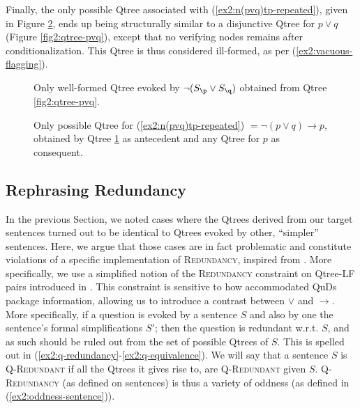 Finally, the only possible Qtree associated with (\ref{ex2:n(pvq)tp-repeated}), given in Figure \ref{fig2:qtree-n(pvq)tp-wh}, ends up being structurally similar to a disjunctive Qtree for $p\vee q$ (Figure \ref{fig2:qtree-pvq}), except that no verifying nodes remains after conditionalization. This Qtree is thus considered ill-formed, as per (\ref{ex2:vacuous-flagging}).	


\begin{multicols}{2}
	\begin{figure}[H]
		\centering
		\scalebox{1}{
			\begin{forest}
				[CS [{$\p$}] [{$\q$}] [\fbox{\r}] [\fbox{...}]]
			\end{forest}
		}
		\caption{Only well-formed Qtree evoked by $\neg(S\protect_{\p} \vee S\protect_{\q})$ obtained from Qtree \ref{fig2:qtree-pvq}.}\label{fig2:qtree-n(pvq)}
	\end{figure}\columnbreak
	\begin{figure}[H]
		\centering
		\scalebox{1}{
			\begin{forest}
				[CS [{{$\p$}}][{$\q$}][\dbox{$\r$}][\dbox{...}]]
			\end{forest}
		}
		\caption{Only possible Qtree for (\ref{ex2:n(pvq)tp-repeated}) $= \neg (p \vee q ) \rightarrow p$, obtained by Qtree \ref{fig2:qtree-n(pvq)} as antecedent and any Qtree for $p$ as consequent.}\label{fig2:qtree-n(pvq)tp-wh}
	\end{figure}
	
\end{multicols}
	


\subsection{Rephrasing Redundancy}\label{sec:q-redundancy}
In the previous Section, we noted cases where the Qtrees derived from our target sentences turned out to be identical to Qtrees evoked by other, ``simpler'' sentences. Here, we argue that those cases are in fact problematic and constitute violations of a specific implementation of \textsc{Redundancy}, inspired from \citet{Katzir2014,Meyer2013,Mayr2016}. More specifically, we use a simplified notion of the \textsc{Redundancy} constraint on Qtree-LF pairs introduced in \citet{HenotMortier2024}. This constraint is sensitive to how accommodated QuDs package information, allowing us to introduce a contrast between $\vee$ and $\rightarrow$. More specifically, if a question is evoked by a sentence $S$ and also by one the sentence's formal simplifications $S'$; then the question is redundant w.r.t. $S$, and as such should be ruled out from the set of possible Qtrees of $S$. This is spelled out in (\ref{ex2:q-redundancy}-\ref{ex2:q-equivalence}). We will say that a sentence $S$ is \textsc{Q-Redundant} if all the Qtrees it gives rise to, are \textsc{Q-Redundant} given $S$. \textsc{Q-Redundancy} (as defined on sentences) is thus a variety of oddness (as defined in (\ref{ex2:oddness-sentence})).

